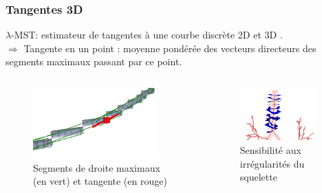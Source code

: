 \documentclass{beamer}
\begin{document}
\begin{frame}
	\frametitle{Tangentes 3D}
	\vspace{-0.5cm}
	$\lambda$-MST: estimateur de tangentes à une courbe discrète 2D  et 3D . \\
						
	$\Rightarrow$ Tangente en un point : moyenne pondérée des vecteurs directeurs des segments maximaux passant par ce point.
	\vspace{-0.4cm}
	\begin{columns}[b]
		\begin{column}{0.48\textwidth}
			\begin{figure}
				\includegraphics[width=0.9\textwidth]{fig/tangent3D2.png}
				\caption{Segments de droite maximaux (en vert) et tangente (en rouge)}
			\end{figure}
		\end{column}
											
		\begin{column}{0.48\textwidth}
			\begin{figure}
				\includegraphics[width=0.9\textwidth]{fig/mst13closeup.png}
				\caption{Sensibilité aux irrégularités du squelette}
			\end{figure}
		\end{column}
	\end{columns}
						
						
							
\end{frame}
\end{document}
